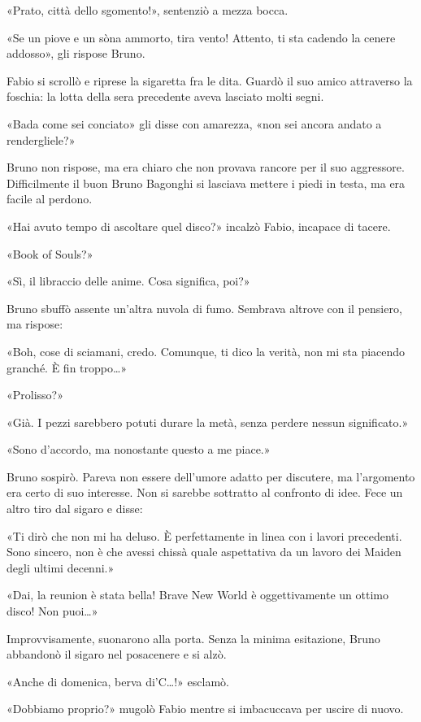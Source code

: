 «Prato, città dello sgomento!», sentenziò a mezza bocca.

«Se \textsc{}un piove e \textsc{}un sòna ammorto, tira vento! Attento, ti sta cadendo la cenere addosso», gli rispose Bruno.

Fabio si scrollò e riprese la sigaretta fra le dita. Guardò il suo amico attraverso la foschia: la lotta della sera precedente aveva lasciato molti segni.

«Bada come sei conciato» gli disse con amarezza, «non sei ancora andato a rendergliele?»

Bruno non rispose, ma era chiaro che non provava rancore per il suo aggressore. Difficilmente il buon Bruno Bagonghi si lasciava mettere i piedi in testa, ma era facile al perdono.

«Hai avuto tempo di ascoltare quel disco?» incalzò Fabio, incapace di tacere.

«Book of Souls?»

«Sì, il libraccio delle anime. Cosa significa, poi?»

Bruno sbuffò assente un'altra nuvola di fumo. Sembrava altrove con il pensiero, ma rispose:

«Boh, cose di sciamani, credo. Comunque, ti dico la verità, non mi sta piacendo granché. È fin troppo\ldots»

«Prolisso?»

«Già. I pezzi sarebbero potuti durare la metà, senza perdere nessun significato.»

«Sono d'accordo, ma nonostante questo a me piace.»

Bruno sospirò. Pareva non essere dell'umore adatto per discutere, ma l'argomento era certo di suo interesse. Non si sarebbe sottratto al confronto di idee. Fece un altro tiro dal sigaro e disse:

«Ti dirò che non mi ha deluso. È perfettamente in linea con i lavori precedenti. Sono sincero, non è che avessi chissà quale aspettativa da un lavoro dei Maiden degli ultimi decenni.»

«Dai, la reunion è stata bella! Brave New World è oggettivamente un ottimo disco! Non puoi\ldots»

Improvvisamente, suonarono alla porta. Senza la minima esitazione, Bruno abbandonò il sigaro nel posacenere e si alzò.

«Anche di domenica, berva di'C\ldots!» esclamò.

«Dobbiamo proprio?» mugolò Fabio mentre si imbacuccava per uscire di nuovo.

